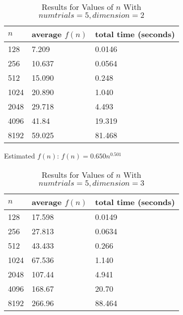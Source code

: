 \documentclass[11pt]{article}
\begin{document}
	\begin{table}[h]
		\centering
		\caption{Results for Values of $n$ With $numtrials = 5, dimension = 2$}
		\begin{tabular}{lll}
			$n$                         & average $f(n)$                        & total time (seconds)                        \\ \hline
			\multicolumn{1}{|l|}{128} & \multicolumn{1}{l|}{7.209} & \multicolumn{1}{l|}{0.0146} \\ \hline
			\multicolumn{1}{|l|}{256}    & \multicolumn{1}{l|}{10.637}       & \multicolumn{1}{l|}{0.0564}       \\ \hline
			\multicolumn{1}{|l|}{512}    & \multicolumn{1}{l|}{15.090}       & \multicolumn{1}{l|}{0.248}       \\ \hline
			\multicolumn{1}{|l|}{1024}    & \multicolumn{1}{l|}{20.890}       & \multicolumn{1}{l|}{1.040}       \\ \hline
			\multicolumn{1}{|l|}{2048}    & \multicolumn{1}{l|}{29.718}       & \multicolumn{1}{l|}{4.493}       \\ \hline
			\multicolumn{1}{|l|}{4096}    & \multicolumn{1}{l|}{41.84}       & \multicolumn{1}{l|}{19.319}       \\ \hline
			\multicolumn{1}{|l|}{8192}    & \multicolumn{1}{l|}{59.025}       & \multicolumn{1}{l|}{81.468}       \\ \hline
		\end{tabular}
	\end{table}
	Estimated $f(n)$: $f(n) = 0.650n^{0.501}$
	\newpage
	\begin{table}[h]
		\centering
		\caption{Results for Values of $n$ With $numtrials = 5, dimension = 3$}
		\begin{tabular}{lll}
			$n$                         & average $f(n)$                        & total time (seconds)                        \\ \hline
			\multicolumn{1}{|l|}{128} & \multicolumn{1}{l|}{17.598} & \multicolumn{1}{l|}{0.0149} \\ \hline
			\multicolumn{1}{|l|}{256}    & \multicolumn{1}{l|}{27.813}       & \multicolumn{1}{l|}{0.0634}       \\ \hline
			\multicolumn{1}{|l|}{512}    & \multicolumn{1}{l|}{43.433}       & \multicolumn{1}{l|}{0.266}       \\ \hline
			\multicolumn{1}{|l|}{1024}    & \multicolumn{1}{l|}{67.536}       & \multicolumn{1}{l|}{1.140}       \\ \hline
			\multicolumn{1}{|l|}{2048}    & \multicolumn{1}{l|}{107.44}       & \multicolumn{1}{l|}{4.941}       \\ \hline
			\multicolumn{1}{|l|}{4096}    & \multicolumn{1}{l|}{168.67}       & \multicolumn{1}{l|}{20.70}       \\ \hline
			\multicolumn{1}{|l|}{8192}    & \multicolumn{1}{l|}{266.96}       & \multicolumn{1}{l|}{88.464}       \\ \hline
		\end{tabular}
	\end{table}
\end{document}
